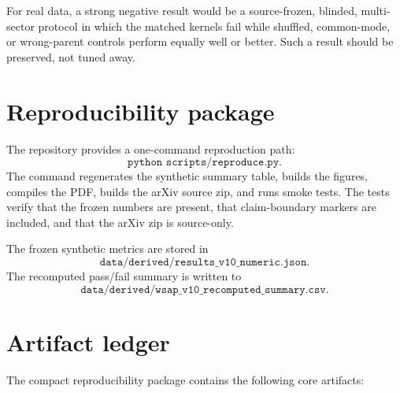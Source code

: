 \documentclass[12pt]{article}
\begin{document}
For real data, a strong negative result would be a source-frozen, blinded,
multi-sector protocol in which the matched kernels fail while shuffled,
common-mode, or wrong-parent controls perform equally well or better.  Such a
result should be preserved, not tuned away.

\section{Reproducibility package}

The repository provides a one-command reproduction path:
\[
  \texttt{python scripts/reproduce.py}.
\]
The command regenerates the synthetic summary table, builds the figures,
compiles the PDF, builds the arXiv source zip, and runs smoke tests.  The
tests verify that the frozen numbers are present, that claim-boundary markers
are included, and that the arXiv zip is source-only.

The frozen synthetic metrics are stored in
\[
  \texttt{data/derived/results\_v10\_numeric.json}.
\]
The recomputed pass/fail summary is written to
\[
  \texttt{data/derived/wsap\_v10\_recomputed\_summary.csv}.
\]

\section{Artifact ledger}

The compact reproducibility package contains the following core artifacts:
\end{document}
